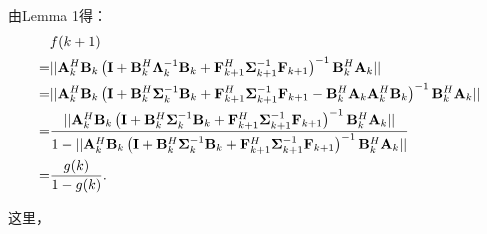 \documentclass[a4paper,11pt]{article}
\newcommand\V[1]{\mathrm{\bf{#1}}}
\newcommand\Nm[1]{\lvert\lvert #1\rvert\rvert}
\newcommand\SB[1]{\left(#1\right)}
\begin{document}
由Lemma 1得：
\begin{equation}
\begin{split}
&f(k+1)\\
=&\Nm{\V{A}_k^H\V{B}_k\SB{\V{I}+\V{B}_{k}^H\bm{\Lambda}^{-1}_{k}\V{B}_{k}+\V{F}_{k+1}^H\bm{\Sigma}^{-1}_{k+1}\V{F}_{k+1}}^{-1}\V{B}_k^H\V{A}_k}\\
=&\Nm{\V{A}_k^H\V{B}_k\SB{\V{I}+\V{B}_{k}^H\bm{\Sigma}^{-1}_{k}\V{B}_{k}+\V{F}_{k+1}^H\bm{\Sigma}^{-1}_{k+1}\V{F}_{k+1}-\V{B}_{k}^H\V{A}_k\V{A}_k^H\V{B}_{k}}^{-1}\V{B}_k^H\V{A}_k}\\
=&\frac{\Nm{\V{A}_k^H\V{B}_k\SB{\V{I}+\V{B}_{k}^H\bm{\Sigma}^{-1}_{k}\V{B}_{k}+\V{F}_{k+1}^H\bm{\Sigma}^{-1}_{k+1}\V{F}_{k+1}}^{-1}\V{B}_k^H\V{A}_k}}{1-\Nm{\V{A}_k^H\V{B}_k\SB{\V{I}+\V{B}_{k}^H\bm{\Sigma}^{-1}_{k}\V{B}_{k}+\V{F}_{k+1}^H\bm{\Sigma}^{-1}_{k+1}\V{F}_{k+1}}^{-1}\V{B}_k^H\V{A}_k}}\\
=&\frac{g(k)}{1-g(k)}.
\end{split}
\end{equation}

这里，
\end{document}
